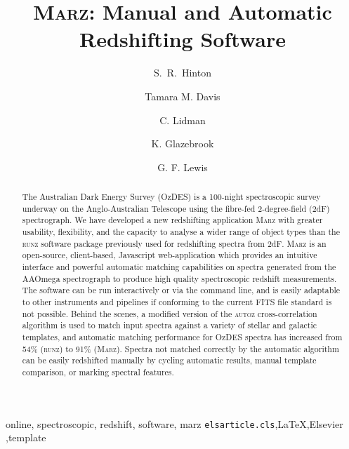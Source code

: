 \documentclass[5p]{elsarticle}
\newcommand{\runz}{\textsc{runz}}
\newcommand{\autoz}{\textsc{autoz}}
\newcommand{\marz}{\textsc{Marz}}
\begin{document}
\begin{frontmatter}

\title{\marz{}: Manual and Automatic Redshifting Software}


\author[affil1,affil2]{S.~R.~Hinton}
\author[affil1]{Tamara M. Davis}
\author[affil3]{C. Lidman}
\author[affil4]{K. Glazebrook}
\author[affil5]{G. F. Lewis}

\address[affil1]{School of Mathematics and Physics, The University of Queensland, QLD 4072, Australia}
\address[affil2]{ARC Centre of Excellence for All-sky Astrophysics (CAASTRO)}
\address[affil3]{Australian Astronomical Observatory, North Ryde, NSW 2113, Australia}
\address[affil4]{Centre for Astrophysics and Supercomputing, Swinburne, University of Technology, Hawthorn, VIC 3122, Australia}
\address[affil5]{Sydney Institute for Astronomy, School of Physics, A28, The University of Sydney, NSW, 2006, Australia}

\begin{abstract}
The Australian Dark Energy Survey (OzDES) is a 100-night spectroscopic survey underway on the Anglo-Australian Telescope using the fibre-fed 2-degree-field (2dF) spectrograph.  We have developed a new redshifting application \marz{} with greater usability, flexibility, and the capacity to analyse a wider range of object types than the \runz{} software package previously used for redshifting spectra from 2dF. \marz{} is an open-source, client-based, Javascript web-application which provides an intuitive interface and powerful automatic matching capabilities on spectra generated from the AAOmega spectrograph to produce high quality spectroscopic redshift measurements. The software can be run interactively or via the command line, and is easily adaptable to other instruments and pipelines if conforming to the current FITS file standard is not possible. Behind the scenes, a modified version of the \autoz{} cross-correlation algorithm is used to match input spectra against a variety of stellar and galactic templates, and automatic matching performance for OzDES spectra has increased from 54\% (\runz{}) to 91\% (\marz{}). Spectra not matched correctly by the automatic algorithm can be easily redshifted manually by cycling automatic results, manual template comparison, or marking spectral features.
\end{abstract}

\begin{keyword}
online, spectroscopic, redshift, software, marz
\texttt{elsarticle.cls}\sep \LaTeX\sep Elsevier \sep template
\end{keyword}

\end{frontmatter}
\end{document}
